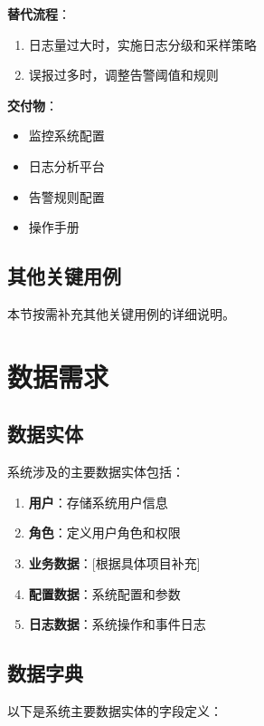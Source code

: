 \documentclass[a4paper,12pt]{article}
\begin{document}
\textbf{替代流程}：
\begin{enumerate}
  \item 日志量过大时，实施日志分级和采样策略
  \item 误报过多时，调整告警阈值和规则
\end{enumerate}

\textbf{交付物}：
\begin{itemize}
  \item 监控系统配置
  \item 日志分析平台
  \item 告警规则配置
  \item 操作手册
\end{itemize}

\subsection{其他关键用例}

本节按需补充其他关键用例的详细说明。

\section{数据需求}

\subsection{数据实体}

系统涉及的主要数据实体包括：

\begin{enumerate}
  \item \textbf{用户}：存储系统用户信息
  \item \textbf{角色}：定义用户角色和权限
  \item \textbf{业务数据}：[根据具体项目补充]
  \item \textbf{配置数据}：系统配置和参数
  \item \textbf{日志数据}：系统操作和事件日志
\end{enumerate}

\subsection{数据字典}

以下是系统主要数据实体的字段定义：
\end{document}
